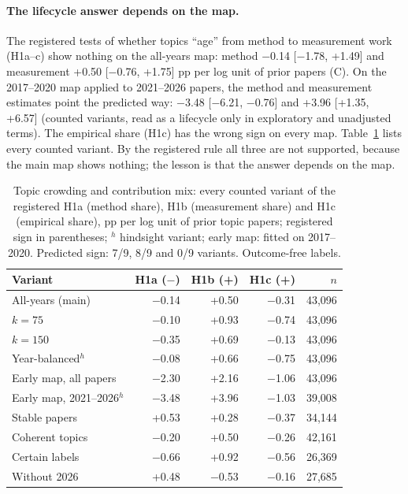 \paragraph{The lifecycle answer depends on the map.} The registered tests of whether topics ``age'' from method to
measurement work (H1a--c) show nothing on the all-years map: method $-$0.14 [$-$1.78, +1.49] and measurement +0.50
[$-$0.76, +1.75] pp per log unit of prior papers (C). On the 2017--2020 map applied to 2021--2026 papers, the method
and measurement estimates point the predicted way: $-$3.48 [$-$6.21, $-$0.76] and +3.96 [+1.35, +6.57] (counted
variants, read as a lifecycle only in exploratory and unadjusted terms). The empirical share (H1c) has the wrong sign
on every map. Table~\ref{tab:app-life} lists every counted variant. By the registered rule all three are not
supported, because the main map shows nothing; the lesson is that the answer depends on the map.

\begin{table}[t]
\centering\footnotesize
\setlength{\tabcolsep}{2pt}
\begin{tabular}{@{}lrrrr@{}}
\toprule
Variant & H1a ($-$) & H1b (+) & H1c (+) & $n$ \\
\midrule
All-years (main) & $-$0.14 & +0.50 & $-$0.31 & 43,096 \\
$k=75$ & $-$0.10 & +0.93 & $-$0.74 & 43,096 \\
$k=150$ & $-$0.35 & +0.69 & $-$0.13 & 43,096 \\
Year-balanced$^h$ & $-$0.08 & +0.66 & $-$0.75 & 43,096 \\
Early map, all papers & $-$2.30 & +2.16 & $-$1.06 & 43,096 \\
Early map, 2021--2026$^h$ & $-$3.48 & +3.96 & $-$1.03 & 39,008 \\
Stable papers & +0.53 & +0.28 & $-$0.37 & 34,144 \\
Coherent topics & $-$0.20 & +0.50 & $-$0.26 & 42,161 \\
Certain labels & $-$0.66 & +0.92 & $-$0.56 & 26,369 \\
Without 2026 & +0.48 & $-$0.53 & $-$0.16 & 27,685 \\
\bottomrule
\end{tabular}
\caption{Topic crowding and contribution mix: every counted variant of the registered H1a (method share), H1b
(measurement share) and H1c (empirical share), pp per log unit of prior topic papers; registered sign in
parentheses; $^h$ hindsight variant; early map: fitted on 2017--2020. Predicted sign: 7/9, 8/9 and 0/9 variants. Outcome-free labels.}
\label{tab:app-life}
\end{table}

